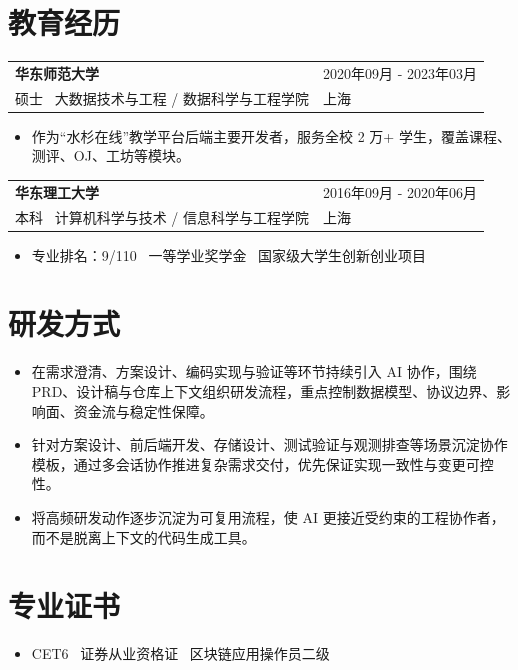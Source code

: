 \documentclass[10pt]{article}
\makeatletter
\newcommand{\resumeEntry}[4]{
  \begin{tabularx}{\textwidth}{@{}X>{\raggedleft\arraybackslash}p{5.2cm}@{}}
    {\fontsize{11.5}{13.5}\selectfont\bfseries\color{heading} #1} & {\small\color{subtle} #3} \\
    {\small\color{textgray} #2} & {\small\color{textgray} #4} \\
  \end{tabularx}
  \vspace{2pt}
}
\newcommand{\eduEntryGap}{
  \vspace{2pt}
}
\newcommand{\afterListGap}{
  \vspace{1pt}
}
\newcommand{\sectionGap}{
  \vspace{6pt}
}
\makeatother
\begin{document}
\sectionGap

\section{教育经历}

\resumeEntry
  {华东师范大学}
  {硕士 \textbar\ 大数据技术与工程 / 数据科学与工程学院}
  {2020年09月 - 2023年03月}
  {上海}
\begin{itemize}
  \item 作为“水杉在线”教学平台后端主要开发者，服务全校 2 万+ 学生，覆盖课程、测评、OJ、工坊等模块。
\end{itemize}
\afterListGap

\eduEntryGap
\resumeEntry
  {华东理工大学}
  {本科 \textbar\ 计算机科学与技术 / 信息科学与工程学院}
  {2016年09月 - 2020年06月}
  {上海}
\begin{itemize}
  \item 专业排名：9/110 \textbar\ 一等学业奖学金 \textbar\ 国家级大学生创新创业项目
\end{itemize}
\sectionGap

\section{研发方式}

\begin{itemize}
  \item 在需求澄清、方案设计、编码实现与验证等环节持续引入 AI 协作，围绕 PRD、设计稿与仓库上下文组织研发流程，重点控制数据模型、协议边界、影响面、资金流与稳定性保障。
  \item 针对方案设计、前后端开发、存储设计、测试验证与观测排查等场景沉淀协作模板，通过多会话协作推进复杂需求交付，优先保证实现一致性与变更可控性。
  \item 将高频研发动作逐步沉淀为可复用流程，使 AI 更接近受约束的工程协作者，而不是脱离上下文的代码生成工具。
\end{itemize}
\sectionGap

\section{专业证书}

\begin{itemize}
  \item CET6 \textbar\ 证券从业资格证 \textbar\ 区块链应用操作员二级
\end{itemize}
\end{document}
